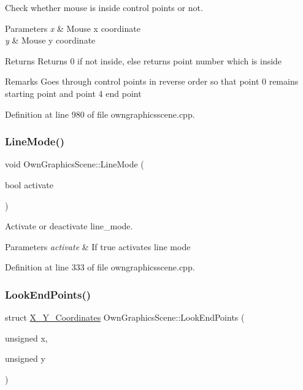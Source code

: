 Check whether mouse is inside control points or not. 


\begin{DoxyParams}{Parameters}
{\em x} & Mouse x coordinate \\
\hline
{\em y} & Mouse y coordinate \\
\hline
\end{DoxyParams}
\begin{DoxyReturn}{Returns}
Returns 0 if not inside, else returns point number which is inside 
\end{DoxyReturn}
\begin{DoxyRemark}{Remarks}
Goes through control points in reverse order so that point 0 remains starting point and point 4 end point 
\end{DoxyRemark}


Definition at line 980 of file owngraphicsscene.\+cpp.

\mbox{\label{classOwnGraphicsScene_a6b7e69131827f0ae64626af378ff9974}} 
\subsubsection{\texorpdfstring{Line\+Mode()}{LineMode()}}
{\footnotesize\ttfamily void Own\+Graphics\+Scene\+::\+Line\+Mode (\begin{DoxyParamCaption}\item[{bool}]{activate }\end{DoxyParamCaption})}



Activate or deactivate line\+\_\+mode. 


\begin{DoxyParams}{Parameters}
{\em activate} & If true activates line mode \\
\hline
\end{DoxyParams}


Definition at line 333 of file owngraphicsscene.\+cpp.

\mbox{\label{classOwnGraphicsScene_a17930b28f2c5cb7ed14440e44d667951}} 
\subsubsection{\texorpdfstring{Look\+End\+Points()}{LookEndPoints()}}
{\footnotesize\ttfamily struct \mbox{\hyperlink{structX__Y__Coordinates}{X\+\_\+\+Y\+\_\+\+Coordinates}} Own\+Graphics\+Scene\+::\+Look\+End\+Points (\begin{DoxyParamCaption}\item[{unsigned}]{x,  }\item[{unsigned}]{y }\end{DoxyParamCaption})}



